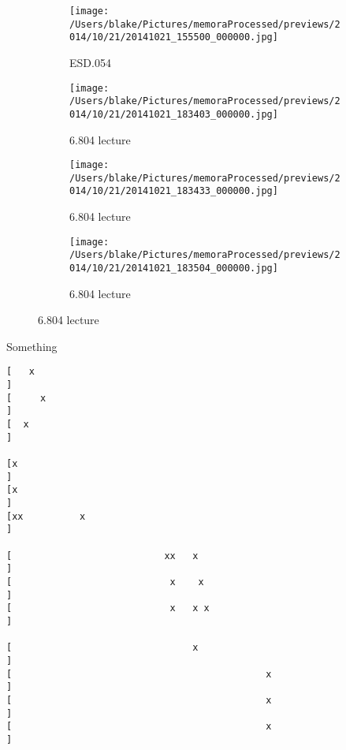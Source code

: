 \documentclass{article}
\begin{document}
\begin{figure}[h]
\centering



\begin{subfigure}{.25\textwidth}\centering\texttt{[image: /Users/blake/Pictures/memoraProcessed/previews/2014/10/21/20141021\_155500\_000000.jpg]}\caption{ESD.054
}\end{subfigure}
\begin{subfigure}{.25\textwidth}\centering\texttt{[image: /Users/blake/Pictures/memoraProcessed/previews/2014/10/21/20141021\_183403\_000000.jpg]}\caption{6.804 lecture
}\end{subfigure}
\begin{subfigure}{.25\textwidth}\centering\texttt{[image: /Users/blake/Pictures/memoraProcessed/previews/2014/10/21/20141021\_183433\_000000.jpg]}\caption{6.804 lecture
}\end{subfigure}
\begin{subfigure}{.25\textwidth}\centering\texttt{[image: /Users/blake/Pictures/memoraProcessed/previews/2014/10/21/20141021\_183504\_000000.jpg]}\caption{6.804 lecture
}\end{subfigure}
\end{figure}

\pagebreak[4]

Something

\begin{verbatim}
[   x                                                                  ]
[     x                                                                ]
[  x                                                                   ]

[x                                                                     ]
[x                                                                     ]
[xx          x                                                         ]

[                           xx   x                                     ]
[                            x    x                                    ]
[                            x   x x                                   ]

[                                x                                     ]
[                                             x                        ]
[                                             x                        ]
[                                             x                        ]
\end{verbatim}



\end{document}
